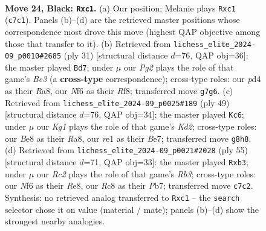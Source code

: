 \documentclass[11pt]{article}
\begin{document}
\clearpage

\begin{figure}[p]\centering
\begin{subfigure}{0.46\textwidth}\centering
\resizebox{\linewidth}{!}{%
\newchessgame
\chessboard[
  setfen={2r1b1k1/p1r2pp1/R3pn2/1p5p/3P1P2/1P4PP/1N2P3/2B1RBK1 b - - 0 24},
  showmover=false,
  pgfstyle=straightmove, color=movearrow, markmove={c7-c1}
]}
\caption{}
\end{subfigure}\hfill
\begin{subfigure}{0.46\textwidth}\centering
\resizebox{\linewidth}{!}{%
\newchessgame
\chessboard[
  setfen={r4rk1/pp4bp/2n1b1p1/2p1pp2/P7/2P3P1/1P1N1PBP/R1B1R1K1 b - - 0 16},
  showmover=false,
  pgfstyle=straightmove, color=movearrow, markmove={e6-d7}
]}
\caption{}
\end{subfigure}
\\[4pt]
\begin{subfigure}{0.46\textwidth}\centering
\resizebox{\linewidth}{!}{%
\newchessgame
\chessboard[
  setfen={r6r/3kbpp1/pn1p3p/R3pP2/2p1P1P1/7P/PP3BB1/3R2K1 b - - 7 25},
  showmover=false,
  pgfstyle=straightmove, color=movearrow, markmove={d7-c6}
]}
\caption{}
\end{subfigure}\hfill
\begin{subfigure}{0.46\textwidth}\centering
\resizebox{\linewidth}{!}{%
\newchessgame
\chessboard[
  setfen={4r1k1/1p3pb1/1r1np1p1/3p4/P2P2P1/1P2B3/2R1PPB1/R5K1 b - - 0 28},
  showmover=false,
  pgfstyle=straightmove, color=movearrow, markmove={b6-b3}
]}
\caption{}
\end{subfigure}
\caption{\textbf{Move 24, Black: \texttt{Rxc1}.} (a) Our position; Melanie plays \texttt{Rxc1} (\texttt{c7c1}). Panels (b)--(d) are the retrieved master positions whose correspondence most drove this move (highest QAP objective among those that transfer to it). (b) Retrieved from \texttt{lichess\_elite\_2024-09\_p0010\#2685} (ply 31) [structural distance $d$=76, QAP obj=36]: the master played \texttt{Bd7}; under $\mu$ our \emph{Pg2} plays the role of that game's \emph{Be3} (a \textbf{cross-type} correspondence); cross-type roles: our \emph{p}d4 as their \emph{R}a8, our \emph{N}f6 as their \emph{R}f8; transferred move \texttt{g7g6}. (c) Retrieved from \texttt{lichess\_elite\_2024-09\_p0025\#189} (ply 49) [structural distance $d$=76, QAP obj=34]: the master played \texttt{Kc6}; under $\mu$ our \emph{Kg1} plays the role of that game's \emph{Kd2}; cross-type roles: our \emph{B}e8 as their \emph{R}a8, our \emph{r}e1 as their \emph{B}e7; transferred move \texttt{g8h8}. (d) Retrieved from \texttt{lichess\_elite\_2024-09\_p0021\#2028} (ply 55) [structural distance $d$=71, QAP obj=33]: the master played \texttt{Rxb3}; under $\mu$ our \emph{Rc2} plays the role of that game's \emph{Rb3}; cross-type roles: our \emph{N}f6 as their \emph{R}e8, our \emph{R}c8 as their \emph{P}b7; transferred move \texttt{c7c2}. Synthesis: no retrieved analog transferred to \texttt{Rxc1} -- the \texttt{search} selector chose it on value (material / mate); panels (b)--(d) show the strongest nearby analogies.}
\label{fig:thought-m47}
\end{figure}
\end{document}
